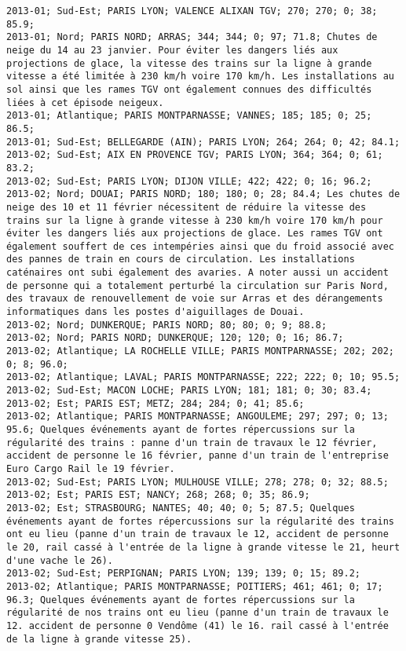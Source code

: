\documentclass{article}
\begin{document}
\begin{Verbatim}[commandchars=\\\{\}]
2013-01; Sud-Est; PARIS LYON; VALENCE ALIXAN TGV; 270; 270; 0; 38; 85.9; 
2013-01; Nord; PARIS NORD; ARRAS; 344; 344; 0; 97; 71.8; Chutes de neige du 14 au 23 janvier. Pour éviter les dangers liés aux projections de glace, la vitesse des trains sur la ligne à grande vitesse a été limitée à 230 km/h voire 170 km/h. Les installations au sol ainsi que les rames TGV ont également connues des difficultés liées à cet épisode neigeux.
2013-01; Atlantique; PARIS MONTPARNASSE; VANNES; 185; 185; 0; 25; 86.5; 
2013-01; Sud-Est; BELLEGARDE (AIN); PARIS LYON; 264; 264; 0; 42; 84.1; 
2013-02; Sud-Est; AIX EN PROVENCE TGV; PARIS LYON; 364; 364; 0; 61; 83.2; 
2013-02; Sud-Est; PARIS LYON; DIJON VILLE; 422; 422; 0; 16; 96.2; 
2013-02; Nord; DOUAI; PARIS NORD; 180; 180; 0; 28; 84.4; Les chutes de neige des 10 et 11 février nécessitent de réduire la vitesse des trains sur la ligne à grande vitesse à 230 km/h voire 170 km/h pour éviter les dangers liés aux projections de glace. Les rames TGV ont également souffert de ces intempéries ainsi que du froid associé avec des pannes de train en cours de circulation. Les installations caténaires ont subi également des avaries. A noter aussi un accident de personne qui a totalement perturbé la circulation sur Paris Nord, des travaux de renouvellement de voie sur Arras et des dérangements informatiques dans les postes d'aiguillages de Douai.
2013-02; Nord; DUNKERQUE; PARIS NORD; 80; 80; 0; 9; 88.8; 
2013-02; Nord; PARIS NORD; DUNKERQUE; 120; 120; 0; 16; 86.7; 
2013-02; Atlantique; LA ROCHELLE VILLE; PARIS MONTPARNASSE; 202; 202; 0; 8; 96.0; 
2013-02; Atlantique; LAVAL; PARIS MONTPARNASSE; 222; 222; 0; 10; 95.5; 
2013-02; Sud-Est; MACON LOCHE; PARIS LYON; 181; 181; 0; 30; 83.4; 
2013-02; Est; PARIS EST; METZ; 284; 284; 0; 41; 85.6; 
2013-02; Atlantique; PARIS MONTPARNASSE; ANGOULEME; 297; 297; 0; 13; 95.6; Quelques événements ayant de fortes répercussions sur la régularité des trains : panne d'un train de travaux le 12 février, accident de personne le 16 février, panne d'un train de l'entreprise Euro Cargo Rail le 19 février.
2013-02; Sud-Est; PARIS LYON; MULHOUSE VILLE; 278; 278; 0; 32; 88.5; 
2013-02; Est; PARIS EST; NANCY; 268; 268; 0; 35; 86.9; 
2013-02; Est; STRASBOURG; NANTES; 40; 40; 0; 5; 87.5; Quelques événements ayant de fortes répercussions sur la régularité des trains ont eu lieu (panne d'un train de travaux le 12, accident de personne le 20, rail cassé à l'entrée de la ligne à grande vitesse le 21, heurt d'une vache le 26).
2013-02; Sud-Est; PERPIGNAN; PARIS LYON; 139; 139; 0; 15; 89.2; 
2013-02; Atlantique; PARIS MONTPARNASSE; POITIERS; 461; 461; 0; 17; 96.3; Quelques événements ayant de fortes répercussions sur la régularité de nos trains ont eu lieu (panne d'un train de travaux le 12. accident de personne 0 Vendôme (41) le 16. rail cassé à l'entrée de la ligne à grande vitesse 25).

\end{Verbatim}
\end{document}

